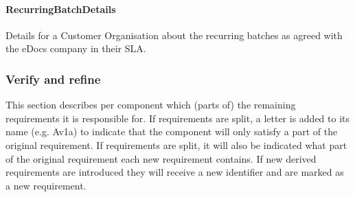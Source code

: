 \documentclass[a4paper,10pt]{article}
\begin{document}
\paragraph{RecurringBatchDetails} Details for a Customer Organisation about the recurring batches as agreed with the eDocs company in their SLA.

\subsubsection{Verify and refine}
This section describes per component which (parts of) the remaining requirements it is responsible for. If requirements are split, a letter is added to its name (e.g. Av1a) to indicate that the component will only satisfy a part of the original requirement. If requirements are split, it will also be indicated what part of the original requirement each new requirement contains. If new derived requirements are introduced they will receive a new identifier and are marked as a new requirement.
\end{document}
